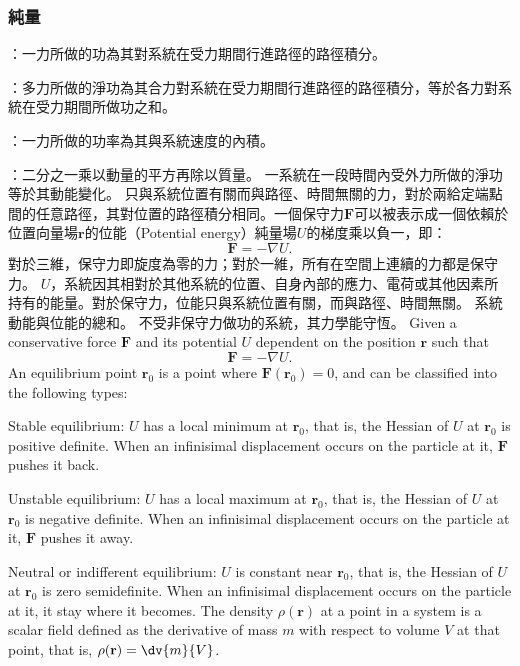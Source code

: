 \documentclass[a4paper,12pt]{article}
\begin{document}
\subsubsection{純量}
\bit
\item{}：一力所做的功為其對系統在受力期間行進路徑的路徑積分。
\item{}：多力所做的淨功為其合力對系統在受力期間行進路徑的路徑積分，等於各力對系統在受力期間所做功之和。
\item{}：一力所做的功率為其與系統速度的內積。
\item{}：二分之一乘以動量的平方再除以質量。
\eit
{}
一系統在一段時間內受外力所做的淨功等於其動能變化。
只與系統位置有關而與路徑、時間無關的力，對於兩給定端點間的任意路徑，其對位置的路徑積分相同。一個保守力$\mathbf{F}$可以被表示成一個依賴於位置向量場$\mathbf{r}$的位能（Potential energy）純量場$U$的梯度乘以負一，即：
\[\mathbf{F}=-\nabla U.\]
對於三維，保守力即旋度為零的力；對於一維，所有在空間上連續的力都是保守力。
$U$，系統因其相對於其他系統的位置、自身內部的應力、電荷或其他因素所持有的能量。對於保守力，位能只與系統位置有關，而與路徑、時間無關。
系統動能與位能的總和。
不受非保守力做功的系統，其力學能守恆。
Given a conservative force $\mathbf{F}$ and its potential $U$ dependent on the position $\mathbf{r}$ such that
\[\mathbf{F}=-\nabla U.\]
An equilibrium point $\mathbf{r}_0$ is a point where $\mathbf{F}(\mathbf{r}_0)=0$, and can be classified into the following types:
\bit
\item Stable equilibrium: $U$ has a local minimum at $\mathbf{r}_0$, that is, the Hessian of $U$ at $\mathbf{r}_0$ is positive definite. When an infinisimal displacement occurs on the particle at it, $\mathbf{F}$ pushes it back.
\item Unstable equilibrium: $U$ has a local maximum at $\mathbf{r}_0$, that is, the Hessian of $U$ at $\mathbf{r}_0$ is negative definite. When an infinisimal displacement occurs on the particle at it, $\mathbf{F}$ pushes it away.
\item Neutral or indifferent equilibrium: $U$ is constant near $\mathbf{r}_0$, that is, the Hessian of $U$ at $\mathbf{r}_0$ is zero semidefinite. When an infinisimal displacement occurs on the particle at it, it stay where it becomes.
\eit
{}
The density $\rho(\mathbf{r})$ at a point in a system is a scalar field defined as the derivative of mass $m$ with respect to volume $V$ at that point, that is, $\rho(\mathbf{r})=\dv{m}{V}$.
\end{document}
